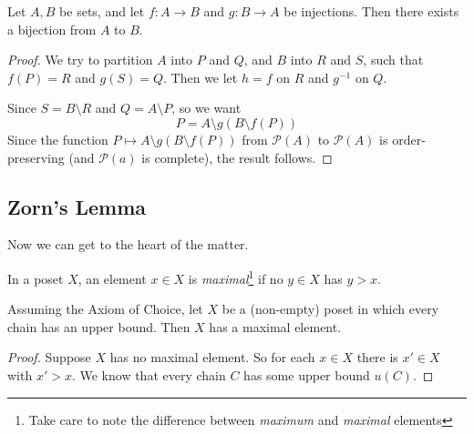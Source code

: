 \documentclass[a3paper, 10pt]{article}
\renewcommand{\vocab}[1]{\emph{#1}}
\begin{document}
\begin{multicols*}{5}
\begin{corollary}
  Let $A, B$ be sets, and let $f: A \rightarrow B$ and $g: B \rightarrow A$ be injections. Then there exists a bijection from $A$ to $B$.
\end{corollary}
\begin{proof}
  We try to partition $A$ into $P$ and $Q$, and $B$ into $R$ and $S$, such that $f(P) = R$ and $g(S) = Q$. Then we let $h = f$ on $R$ and $g^{-1}$ on $Q$.
  \begin{center}
  \end{center}
  Since $S = B\setminus R$ and $Q = A \setminus P$, so we want
  \[
    P = A\setminus g(B\setminus f(P))
  \]
  Since the function $P \mapsto A\setminus g(B\setminus f(P))$ from $\mathcal{P}(A)$ to $\mathcal{P}(A)$ is order-preserving (and $\mathcal{P}(a)$ is complete), the result follows.
\end{proof}

\subsection{Zorn's Lemma}
Now we can get to the heart of the matter.

\begin{definition}
  In a poset $X$, an element $x \in X$ is \vocab{maximal}\footnote{Take care to note the difference between \emph{maximum} and \emph{maximal} elements} if no $y \in X$ has $y > x$.
\end{definition}

\begin{theorem}
Assuming the Axiom of Choice, let $X$ be a (non-empty) poset in which every chain has an upper bound. Then $X$ has a maximal element.
\end{theorem}
\begin{proof}
  Suppose $X$ has no maximal element. So for each $x \in X$ there is $x' \in X$ with $x' > x$. We know that every chain $C$ has some upper bound $u(C)$. 


\end{proof}
\end{multicols*}
\end{document}
